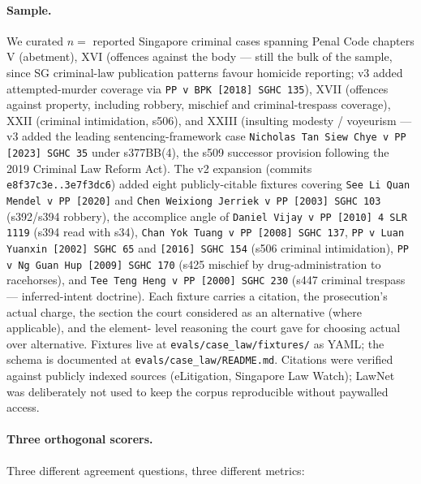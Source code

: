\paragraph{Sample.} We curated $n =$ \statCaseLawN{} reported
Singapore criminal cases spanning Penal Code chapters
\textsf{V} (abetment), \textsf{XVI} (offences against the body
--- still the bulk of the sample, since SG criminal-law
publication patterns favour homicide reporting; v3 added
attempted-murder coverage via \texttt{PP v BPK [2018] SGHC 135}),
\textsf{XVII} (offences against property, including robbery,
mischief and criminal-trespass coverage), \textsf{XXII}
(criminal intimidation, s506), and \textsf{XXIII} (insulting
modesty / voyeurism — v3 added the leading sentencing-framework
case \texttt{Nicholas Tan Siew Chye v PP [2023] SGHC 35} under
s377BB(4), the s509 successor provision following the 2019
Criminal Law Reform Act). The v2 expansion (commits
\texttt{e8f37c3e..3e7f3dc6}) added eight publicly-citable fixtures
covering \texttt{See Li Quan Mendel v PP [2020]} and
\texttt{Chen Weixiong Jerriek v PP [2003] SGHC 103} (s392/s394
robbery), the accomplice angle of
\texttt{Daniel Vijay v PP [2010] 4 SLR 1119} (s394 read with s34),
\texttt{Chan Yok Tuang v PP [2008] SGHC 137},
\texttt{PP v Luan Yuanxin [2002] SGHC 65} and
\texttt{[2016] SGHC 154} (s506 criminal intimidation),
\texttt{PP v Ng Guan Hup [2009] SGHC 170} (s425 mischief by
drug-administration to racehorses), and
\texttt{Tee Teng Heng v PP [2000] SGHC 230} (s447 criminal
trespass — inferred-intent doctrine). Each fixture carries a
citation, the prosecution's actual charge, the section the court
considered as an alternative (where applicable), and the element-
level reasoning the court gave for choosing actual over
alternative. Fixtures live at \texttt{evals/case\_law/fixtures/}
as YAML; the schema is documented at
\texttt{evals/case\_law/README.md}. Citations were verified
against publicly indexed sources (eLitigation, Singapore Law Watch);
LawNet was deliberately not used to keep the corpus reproducible
without paywalled access.

\paragraph{Three orthogonal scorers.} Three different agreement
questions, three different metrics:

